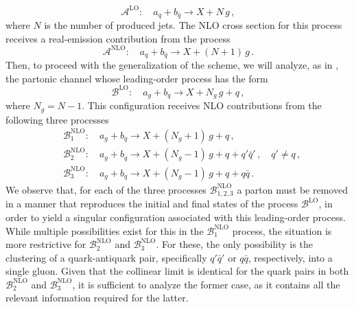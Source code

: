 \documentclass[a4paper, 12pt]{book}
\begin{document}
\begin{equation}
  \mathcal{A}^{\mathrm{LO}}: \quad a_q + b_{\bar{q}} \to X + N \, g \, ,
\end{equation}
where $N$ is the number of produced jets. The NLO cross section for this process receives a real-emission contribution from the process
\begin{equation}
  \mathcal{A}^{\mathrm{NLO}}: \quad a_q + b_{\bar{q}} \to X + (N+1) \, g \, .
\end{equation}
Then, to proceed with the generalization of the scheme, we will analyze, as in \cite{Devoto:2025kin}, the partonic channel whose leading-order process has the form \cite{Devoto:2025kin}
\begin{equation}
  \mathcal{B}^{\mathrm{LO}}: \quad a_g + b_q \to X + N_g \, g + q \, ,
\end{equation}
where $N_g=N-1$. This configuration receives NLO contributions from the following three processes
\begin{equation}
  \begin{aligned}
    &\mathcal{B}_1^{\mathrm{NLO}} : \quad a_g + b_q \to X + (N_g+1) \, g + q\, , \\
    & \mathcal{B}_2^{\mathrm{NLO}} : \quad a_g + b_q \to X + (N_g-1) \, g +q + q'\bar{q}'\, , \quad q' \neq q \, , \\
    & \mathcal{B}_3^{\mathrm{NLO}} : \quad a_g + b_q \to X + (N_g-1) \, g +q + q\bar{q}\,  .
  \end{aligned}
\end{equation}
We observe that, for each of the three processes $\mathcal{B}_{1,2,3}^{\mathrm{NLO}}$ a parton must be removed in a manner that reproduces the initial and final states of the process $\mathcal{B}^{\mathrm{LO}}$, in order to yield a singular configuration associated with this leading-order process. While multiple possibilities exist for this in the $\mathcal{B}_1^{\mathrm{NLO}}$ process, the situation is more restrictive for $\mathcal{B}_2^{\mathrm{NLO}}$ and $\mathcal{B}_3^{\mathrm{NLO}}$. For these, the only possibility is the clustering of a quark-antiquark pair, specifically $q'\bar{q}'$ or $q\bar{q}$, respectively, into a single gluon. Given that the collinear limit is identical for the quark pairs in both $\mathcal{B}_{2}^{\mathrm{NLO}}$ and $\mathcal{B}_{3}^{\mathrm{NLO}}$, it is sufficient to analyze the former case, as it contains all the relevant information required for the latter.
\end{document}
